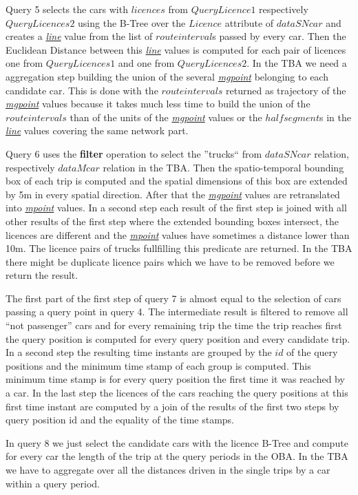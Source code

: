 \documentclass[a4paper]{article}
\newcommand{\op}[1]{\textbf{#1}}
\newcommand{\dt}[1]{\textsl{\underline{#1}}}
\begin{document}
Query 5 selects the cars with $licences$ from $QueryLicence1$ respectively
$QueryLicences2$  using the B-Tree over the $Licence$ attribute of $dataSNcar$
and creates a \dt{line} value from the list of $route interval$s passed by
every car. Then the Euclidean Distance between this \dt{line} values is computed
for each pair of licences one from $QueryLicences1$ and one  from $QueryLicences2$.
In the TBA we need a aggregation step building the union of the several
\dt{mgpoint} belonging to each candidate car. This is done with the $route intervals$
returned as trajectory of the \dt{mgpoint} values because it takes much less
time to build the union of the $route intervals$ than of the units of the
\dt{mgpoint} values or the $half segment$s in the \dt{line} values covering the
same network part.

Query 6 uses the \op{filter} operation to select the ''trucks`` from $dataSNcar$
relation, respectively $dataMcar$ relation in the TBA. Then the spatio-temporal
bounding box of each trip is computed and the spatial dimensions of this box are
extended by 5m in every spatial direction. After that the \dt{mgpoint} values are
retranslated into \dt{mpoint} values. In a second step each result of the first
step is joined with all other results of the first step where the extended bounding
boxes intersect, the licences are different and the \dt{mpoint} values have sometimes
a distance lower than 10m. The licence pairs of trucks fullfilling this predicate
are returned. In the TBA there might be duplicate licence pairs which we have to
be removed before we return the result.

The first part of the first step of query 7 is almost equal to the selection of cars
passing a query point in query 4. The intermediate result is filtered to remove all
``not passenger'' cars and for every remaining trip the time the trip reaches first
the query position is computed for every query position and every candidate trip. In
a second step the resulting time instants are grouped by the $id$ of the query
positions and the minimum time stamp of each group is computed. This minimum time
stamp is for every query position the first time it was reached by a car. In the
last step the licences of the cars reaching the query positions at this
first time instant are computed by a join of the results of the first two steps by
query position id and the equality of the time stamps.

In query 8 we just select the candidate cars with the licence B-Tree and compute for
every car the length of the trip at the query periods in the OBA. In the TBA we have
to aggregate over all the distances driven in the single trips by a car within a
query period.
\end{document}
